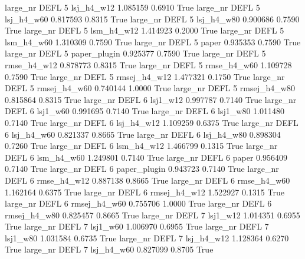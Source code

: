   large_nr     DEFL                 5   lsj_h4_w12    1.085159      0.6910    True
  large_nr     DEFL                 5   lsj_h4_w60    0.817593      0.8315    True
  large_nr     DEFL                 5   lsj_h4_w80    0.900686      0.7590    True
  large_nr     DEFL                 5   lsm_h4_w12    1.414923      0.2000    True
  large_nr     DEFL                 5   lsm_h4_w60    1.310309      0.7590    True
  large_nr     DEFL                 5        paper    0.935353      0.7590    True
  large_nr     DEFL                 5 paper_plugin    0.925377      0.7590    True
  large_nr     DEFL                 5  rmse_h4_w12    0.878773      0.8315    True
  large_nr     DEFL                 5  rmse_h4_w60    1.109728      0.7590    True
  large_nr     DEFL                 5 rmsej_h4_w12    1.477321      0.1750    True
  large_nr     DEFL                 5 rmsej_h4_w60    0.740144      1.0000    True
  large_nr     DEFL                 5 rmsej_h4_w80    0.815864      0.8315    True
  large_nr     DEFL                 6     lsj1_w12    0.997787      0.7140    True
  large_nr     DEFL                 6     lsj1_w60    0.991695      0.7140    True
  large_nr     DEFL                 6     lsj1_w80    1.011480      0.7140    True
  large_nr     DEFL                 6   lsj_h4_w12    1.109259      0.6375    True
  large_nr     DEFL                 6   lsj_h4_w60    0.821337      0.8665    True
  large_nr     DEFL                 6   lsj_h4_w80    0.898304      0.7260    True
  large_nr     DEFL                 6   lsm_h4_w12    1.466799      0.1315    True
  large_nr     DEFL                 6   lsm_h4_w60    1.249801      0.7140    True
  large_nr     DEFL                 6        paper    0.956409      0.7140    True
  large_nr     DEFL                 6 paper_plugin    0.943723      0.7140    True
  large_nr     DEFL                 6  rmse_h4_w12    0.887138      0.8665    True
  large_nr     DEFL                 6  rmse_h4_w60    1.162164      0.6375    True
  large_nr     DEFL                 6 rmsej_h4_w12    1.522927      0.1315    True
  large_nr     DEFL                 6 rmsej_h4_w60    0.755706      1.0000    True
  large_nr     DEFL                 6 rmsej_h4_w80    0.825457      0.8665    True
  large_nr     DEFL                 7     lsj1_w12    1.014351      0.6955    True
  large_nr     DEFL                 7     lsj1_w60    1.006970      0.6955    True
  large_nr     DEFL                 7     lsj1_w80    1.031584      0.6735    True
  large_nr     DEFL                 7   lsj_h4_w12    1.128364      0.6270    True
  large_nr     DEFL                 7   lsj_h4_w60    0.827099      0.8705    True
